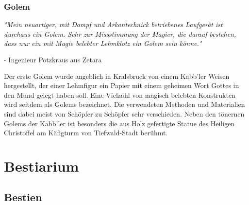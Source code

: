 \documentclass[10pt,twoside,twocolumn,openany]{book}
\begin{document}
\subsection{Golem}
\begin{quotebox}
	\textit{"Mein neuartiger, mit Dampf und Arkantechnick betriebenes Laufgerät ist durchaus ein Golem. Sehr zur Missstimmung der Magier, die darauf bestehen, dass nur ein mit Magie belebter Lehmklotz ein Golem sein könne."}
	\begin{flushright}
		- Ingenieur Potzkraus aus Zetara
	\end{flushright}
\end{quotebox}
Der erste Golem wurde angeblich in Kralsbruck von einem Kabb'ler Weisen hergestellt, der einer Lehmfigur ein Papier mit einem geheimen Wort Gottes in den Mund gelegt haben soll. Eine Vielzahl von magisch belebten Konstrukten wird seitdem als Golems bezeichnet. Die verwendeten Methoden und Materialien sind dabei meist von Schöpfer zu Schöpfer sehr verschieden. Neben den tönernen Golems der Kabb'ler ist besonders die aus Holz gefertigte Statue des Heiligen Christoffel am Käfigturm von Tiefwald-Stadt berühmt.








\chapter{Bestiarium}



\section{Bestien}
\end{document}
